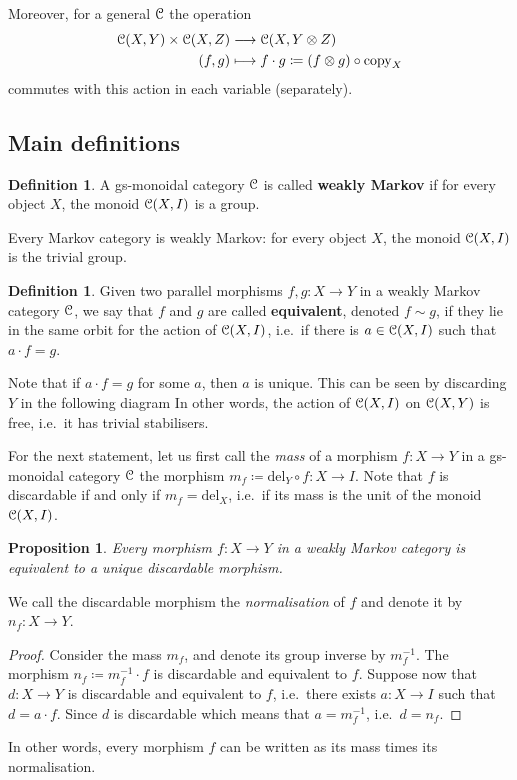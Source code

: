 \documentclass[a4paper,UKenglish,numberwithinsect,cleveref, autoref, thm-restate]{lipics-v2021}
\theoremstyle{plain} %
\newtheorem{myproposition}[mytheorem]{Proposition}
\theoremstyle{definition} %
\newtheorem{mydefinition}[mytheorem]{Definition}
\begin{document}
Moreover, for a general $\mathcal{C}$ the operation
\begin{align*}
	\mathcal{C}(X,Y) \times \mathcal{C}(X,Z) & \longrightarrow \mathcal{C}(X,Y \otimes Z)		\\
	(f,g) & \longmapsto f\cdot g \coloneqq (f\otimes g)\circ\mathrm{copy}_X
\end{align*}
commutes with this action in each variable (separately). 

\subsection{Main definitions}


\begin{mydefinition}\label{defweaklymarkov}
 A gs-monoidal category $\mathcal{C}$ is called \textbf{weakly Markov} if for every object $X$, the monoid $\mathcal{C}(X,I)$ is a group. 
\end{mydefinition}
%
Every Markov category is weakly Markov: for every object $X$, the monoid $\mathcal{C}(X,I)$ is the trivial group.

\begin{mydefinition}
 Given two parallel morphisms $f,g:X\to Y$ in a weakly Markov category $\mathcal{C}$, we say that $f$ and $g$ are called \textbf{equivalent}, denoted $f\sim g$, if they lie in the same orbit for the action of $\mathcal{C}(X,I)$, i.e.~if there is $a\in \mathcal{C}(X,I)$ such that $a\cdot f=g$.
\end{mydefinition}
%
Note that if $a\cdot f=g$ for some $a$, then $a$ is unique. This can be seen by discarding $Y$ in the following diagram
In other words, the action of $\mathcal{C}(X,I)$ on $\mathcal{C}(X,Y)$ is free, i.e.~it has trivial stabilisers.

For the next statement, let us first call the \emph{mass} of a morphism $f:X\to Y$ in a gs-monoidal category $\mathcal{C}$ the morphism $m_f\coloneqq \mathrm{del}_Y\circ f:X\to I$.
Note that $f$ is discardable if and only if $m_f=\mathrm{del}_X$, i.e.~if its mass is the unit of the monoid $\mathcal{C}(X,I)$.

\begin{myproposition}\label{weaklydiscardable}
 Every morphism $f:X\to Y$ in a weakly Markov category is equivalent to a unique discardable morphism.
\end{myproposition}
We call the discardable morphism the \emph{normalisation} of $f$ and denote it by $n_f:X\to Y$.
\begin{proof}
 Consider the mass $m_f$, and denote its group inverse by $m_f^{-1}$. The morphism $n_f\coloneqq m_f^{-1}\cdot f$ is discardable and equivalent to $f$.
 Suppose now that $d:X\to Y$ is discardable and equivalent to $f$, i.e.~there exists $a:X\to I$ such that $d = a\cdot f$. 
 Since $d$ is discardable
 which means that $a=m_f^{-1}$, i.e.~$d=n_f$. 
\end{proof}
In other words, every morphism $f$ can be written as its mass times its normalisation. 
\end{document}
